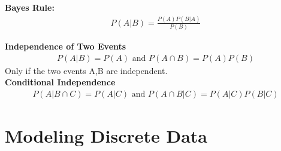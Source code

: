 \documentclass[12pt,twoside]{article}
\begin{document}
\textbf{Bayes Rule:}
\begin{equation}
    \begin{split}
        P(A|B) = \frac{P(A)P(B|A)}{P(B)}
    \end{split}
\end{equation}

\textbf{Independence of Two Events}
\begin{equation}
\begin{split}
    P(A|B) = P(A) \text{ and } P(A\cap B) = P(A)P(B)
\end{split}
\end{equation}
Only if the two events A,B are independent. \\

\textbf{Conditional Independence}
\begin{equation}
    \begin{split}
        P(A|B\cap C) = P(A|C) \text{ and } P(A\cap B|C) = P(A|C)P(B|C)
    \end{split}
\end{equation}


\section{Modeling Discrete Data}
\end{document}
